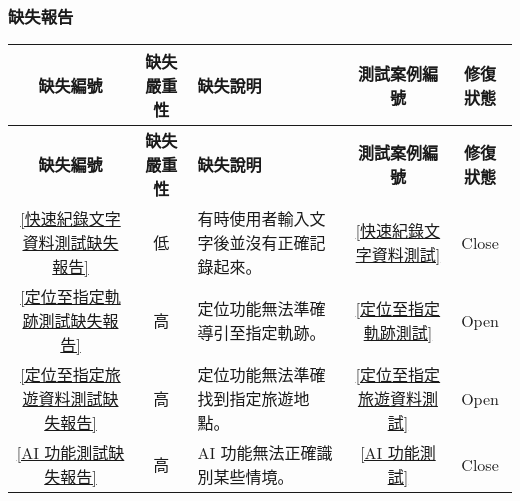 \subsubsection{缺失報告}

\begin{longtable}{|c|c|p{5cm}|c|c|}
  \hline
  \textbf{缺失編號} & \textbf{缺失嚴重性} & \textbf{缺失說明} &  \textbf{測試案例編號} & \textbf{修復狀態} \\
  \hline
  \endfirsthead
  \hline
  \textbf{缺失編號} & \textbf{缺失嚴重性} & \textbf{缺失說明} &  \textbf{測試案例編號} & \textbf{修復狀態} \\
  \hline
  \endhead
  \ref{快速紀錄文字資料測試缺失報告} & 低 & 有時使用者輸入文字後並沒有正確記錄起來。 & \ref{快速紀錄文字資料測試} & Close \\
  \hline
  \rowcolor{orange!25} \ref{定位至指定軌跡測試缺失報告} & 高 & 定位功能無法準確導引至指定軌跡。 & \ref{定位至指定軌跡測試} & Open \\
  \hline
  \rowcolor{orange!25} \ref{定位至指定旅遊資料測試缺失報告} & 高 & 定位功能無法準確找到指定旅遊地點。 & \ref{定位至指定旅遊資料測試} & Open \\
  \hline
  \ref{AI 功能測試缺失報告} & 高 & AI 功能無法正確識別某些情境。 & \ref{AI 功能測試} & Close \\
  \hline
\end{longtable}